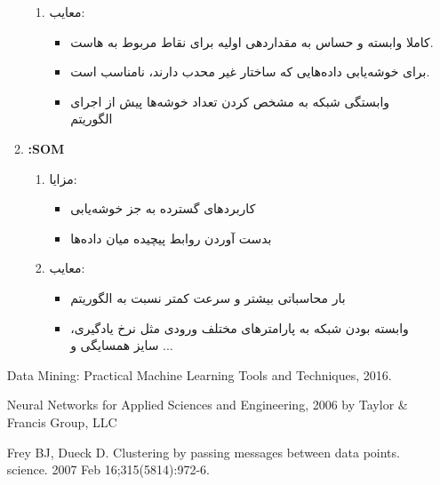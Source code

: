 \begin{enumerate}
\begin{qsolve}
\begin{enumerate}
\begin{enumerate}
			
			\item معایب:
			\begin{itemize}
				\item کاملا وابسته و حساس به مقدار‌دهی اولیه برای نقاط مربوط به  هاست.
				
				\item برای خوشه‌یابی داده‌هایی که ساختار غیر محدب دارند، نامناسب است.
				
				\item وابستگی شبکه به مشخص کردن تعداد خوشه‌ها پیش از اجرای الگوریتم
			\end{itemize}
		\end{enumerate}
		
		
		
		
		
		
		
		
		\item \textbf{:SOM}
		\begin{enumerate}
			\item مزایا:
			\begin{itemize}
				\item کاربردهای گسترده به جز خوشه‌یابی
				\item بدست آوردن روابط پیچیده میان داده‌ها
			\end{itemize}
			
			
			
			
			\item معایب:
			\begin{itemize}
				\item بار محاسباتی بیشتر و سرعت کمتر نسبت به الگوریتم  
				
				\item وابسته بودن شبکه به پارامتر‌های مختلف ورودی مثل نرخ یادگیری، سایز همسایگی و ...
			\end{itemize}
		\end{enumerate}
	\end{enumerate}
	
	
\end{qsolve}



\begin{latin}
	\begin{thebibliography}{9}
		Data Mining: Practical Machine Learning Tools and Techniques, 2016.
		
		Neural Networks for Applied Sciences and Engineering, 2006 by Taylor \& Francis Group, LLC
		
		
		Frey BJ, Dueck D. Clustering by passing messages between data points. science. 2007 Feb 16;315(5814):972-6.
		

\end{thebibliography}
\end{latin}
\end{enumerate}
